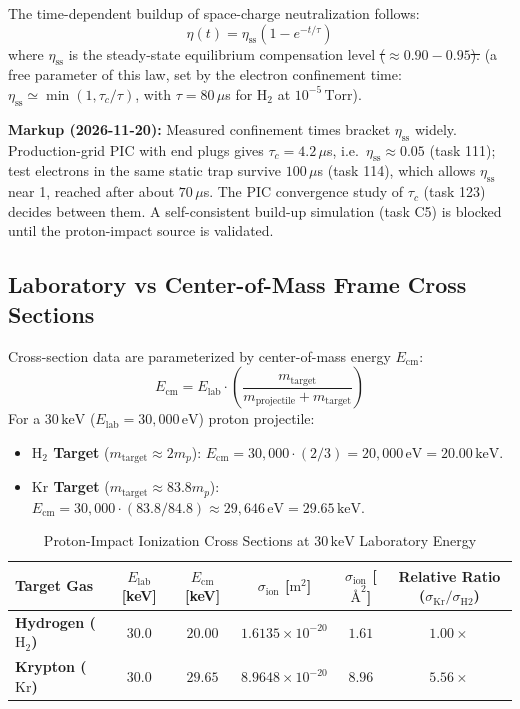 \documentclass[11pt,a4paper]{article}
\newcommand{\old}[1]{\textcolor{red!70!black}{\sout{#1}}}
\newcommand{\new}[1]{\textcolor{blue!60!black}{#1}}
\newcommand{\revnote}[1]{\begin{tcolorbox}[colback=yellow!8,colframe=orange!70!black,boxrule=0.5pt,left=4pt,right=4pt,top=2pt,bottom=2pt]\small\textbf{Markup (2026-11-20):} #1\end{tcolorbox}}
\begin{document}
The time-dependent buildup of space-charge neutralization follows:
\begin{equation}
\eta(t) = \eta_{\text{ss}} \left( 1 - e^{-t/\tau} \right)
\end{equation}
where $\eta_{\text{ss}}$ is the steady-state equilibrium compensation level \old{($\approx 0.90 - 0.95$).} \new{(a free parameter of this law, set by the electron confinement time: $\eta_{\text{ss}} \simeq \min(1, \tau_c/\tau)$, with $\tau = 80\,\mu$s for $\text{H}_2$ at $10^{-5}\,\text{Torr}$).}
\revnote{Measured confinement times bracket $\eta_{\text{ss}}$ widely. Production-grid PIC with
end plugs gives $\tau_c = 4.2\,\mu$s, i.e.\ $\eta_{\text{ss}} \approx 0.05$ (task 111);
test electrons in the same static trap survive $100\,\mu$s (task 114), which allows
$\eta_{\text{ss}}$ near 1, reached after about $70\,\mu$s. The PIC convergence study of $\tau_c$
(task 123) decides between them. A self-consistent build-up simulation (task C5) is blocked
until the proton-impact source is validated.}

\subsection{Laboratory vs Center-of-Mass Frame Cross Sections}
Cross-section data are parameterized by center-of-mass energy $E_{\text{cm}}$:
\begin{equation}
E_{\text{cm}} = E_{\text{lab}} \cdot \left( \frac{m_{\text{target}}}{m_{\text{projectile}} + m_{\text{target}}} \right)
\end{equation}
For a $30\,\text{keV}$ ($E_{\text{lab}} = 30,000\,\text{eV}$) proton projectile:
\begin{itemize}
    \item \textbf{$\text{H}_2$ Target} ($m_{\text{target}} \approx 2 m_p$): $E_{\text{cm}} = 30,000 \cdot (2/3) = 20,000\,\text{eV} = 20.00\,\text{keV}$.
    \item \textbf{$\text{Kr}$ Target} ($m_{\text{target}} \approx 83.8 m_p$): $E_{\text{cm}} = 30,000 \cdot (83.8 / 84.8) \approx 29,646\,\text{eV} = 29.65\,\text{keV}$.
\end{itemize}

\begin{table}[h!]
\centering
\caption{Proton-Impact Ionization Cross Sections at $30\,\text{keV}$ Laboratory Energy}
\label{tab:cross_sections}
\begin{tabular}{lccccc}
\toprule
Target Gas & $E_{\text{lab}}$ [keV] & $E_{\text{cm}}$ [keV] & $\sigma_{\text{ion}}$ [$\text{m}^2$] & $\sigma_{\text{ion}}$ [$\text{\AA}^2$] & Relative Ratio ($\sigma_{\text{Kr}} / \sigma_{\text{H2}}$) \\
\midrule
\textbf{Hydrogen ($\text{H}_2$)} & $30.0$ & $20.00$ & $1.6135 \times 10^{-20}$ & $1.61$ & $1.00\times$ \\
\textbf{Krypton ($\text{Kr}$)} & $30.0$ & $29.65$ & $8.9648 \times 10^{-20}$ & $8.96$ & \textbf{$5.56\times$} \\
\bottomrule
\end{tabular}
\end{table}
\end{document}
